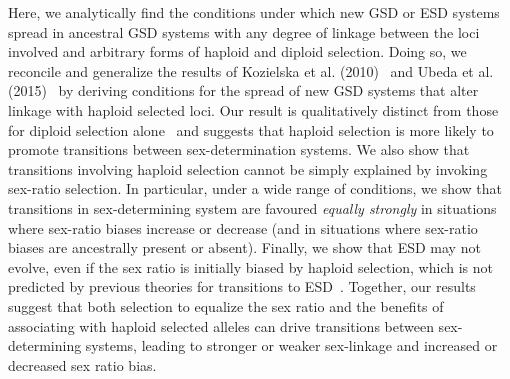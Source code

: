 \documentclass[10pt,letterpaper]{article}
\providecommand{\DIFdelbegin}{} %
\begin{document}
Here, we analytically find the conditions under which new GSD or ESD systems spread in ancestral GSD systems with any degree of linkage between the loci involved and arbitrary forms of haploid and diploid selection. 
Doing so, we reconcile and generalize the results of Kozielska et al. (2010)~\cite{Kozielska:2010vm} and Ubeda et al. (2015)~\cite{Ubeda:2015fx} by deriving conditions for the spread of new GSD systems that alter linkage with haploid selected loci.
Our result is qualitatively distinct from those for diploid selection alone~\cite{vanDoorn:2007eu,vanDoorn:2010hu} and suggests that haploid selection is more likely to promote transitions between sex-determination systems. 
We also show that transitions involving haploid selection cannot be simply explained by invoking sex-ratio selection. 
In particular, under a wide range of conditions, we show that transitions in sex-determining system are favoured \textit{equally strongly} in situations where sex-ratio biases increase or decrease (and in situations where sex-ratio biases are ancestrally present or absent). 
Finally, we show that ESD may not evolve, even if the sex ratio is initially biased by haploid selection, which is not predicted by previous theories for transitions to ESD~\cite{Charnov:1982wg,Bull:1983vi,West:2009we}. 
Together, our results suggest that both selection to equalize the sex ratio and the benefits of associating with haploid selected alleles can drive transitions between sex-determining systems, leading to stronger or weaker sex-linkage and increased or decreased sex ratio bias. 

\DIFdelbegin %


\end{document}
